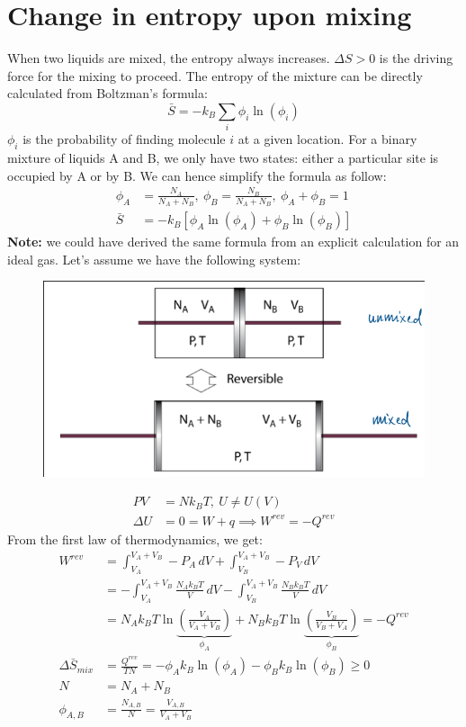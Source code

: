 \documentclass[a4paper, 11pt, normalem]{report}
\begin{document}
\section{Change in entropy upon mixing}
When two liquids are mixed, the entropy always increases. 
$\Delta S > 0$ is the driving force for the mixing to proceed. 
The entropy of the mixture can be directly calculated from Boltzman's formula:
\begin{equation}
    \bar{S} = -k_B\sum_i\phi_i\ln(\phi_i)
\end{equation}
$\phi_i$ is the probability of finding molecule $i$ at a given location. 
For a binary mixture of liquids A and B, we only have two states: either a particular site is occupied by A or by B.
We can hence simplify the formula as follow:
\begin{align}
    \phi_A &= \frac{N_A}{N_A + N_B},~ \phi_B = \frac{N_B}{N_A+N_B},~ \phi_A + \phi_B = 1 \\
    \bar{S} &= -k_B\left[\phi_A\ln(\phi_A) + \phi_B\ln(\phi_B)\right]
\end{align}
\textbf{Note:} we could have derived the same formula from an explicit calculation for an ideal gas.
Let's assume we have the following system:
\begin{figure}[H]
    \centering
    \includegraphics[scale=0.5]{piston.png}
\end{figure}
\begin{align} 
    PV &= Nk_BT,~ U \neq U(V) \\
    \Delta U &= 0 = W + q \implies W^{rev} = -Q^{rev}
\end{align}
From the first law of thermodynamics, we get:
\begin{align}
    W^{rev} &= \int_{V_A}^{V_A+V_B} -P_A\,dV + \int_{V_B}^{V_A+V_B} -P_V\,dV \\
            &= -\int_{V_A}^{V_A+V_B} \frac{N_Ak_BT}{V}\,dV - \int_{V_B}^{V_A+V_B}\frac{N_Bk_BT}{V}\,dV \\
            &= N_Ak_BT\ln\underbrace{\left(\frac{V_A}{V_A+V_B}\right)}_{\phi_A} + N_Bk_BT\ln\underbrace{\left(\frac{V_B}{V_B+V_A}\right)}_{\phi_B} = -Q^{rev} \\
    \Delta\bar{S}_{mix} &= \frac{Q^{rev}}{TN} = -\phi_Ak_B\ln(\phi_A) - \phi_Bk_B\ln(\phi_B) \geq 0 \\
    N &= N_A + N_B \\
    \phi_{A,B} &= \frac{N_{A,B}}{N} = \frac{V_{A,B}}{V_A+V_B}
\end{align}
\end{document}

